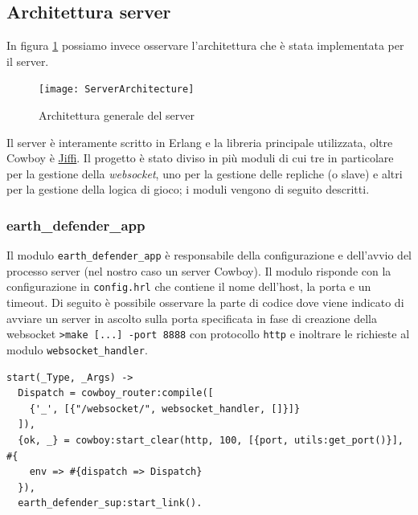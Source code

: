 \documentclass[paper=a4, fontsize=11pt]{scrartcl} %
\numberwithin{equation}{section} %
\numberwithin{figure}{section} %
\numberwithin{table}{section} %
\begin{document}
\subsection{Architettura server}
In figura \ref{ServerArc} possiamo invece osservare l'architettura che è stata implementata per il server.

\begin{figure}
\centering
\texttt{[image: ServerArchitecture]}
\caption{Architettura generale del server}
\label{ServerArc}
\end{figure}

Il server è interamente scritto in Erlang e la libreria principale utilizzata, oltre Cowboy è \href{https://github.com/davisp/jiffy}{Jiffi}. Il progetto è stato diviso in più moduli di cui tre in particolare per la gestione della \textit{websocket}, uno per la gestione delle repliche (o slave) e altri per la gestione della logica di gioco; i moduli vengono di seguito descritti.
\subsubsection{earth\_defender\_app}
Il modulo \texttt{earth\_defender\_app} è responsabile della configurazione e dell'avvio del processo server (nel nostro caso un server Cowboy). Il modulo risponde con la configurazione in \texttt{config.hrl} che contiene il nome dell'host, la porta e un timeout.
Di seguito è possibile osservare la parte di codice dove viene indicato di avviare un server in ascolto sulla porta specificata in fase di creazione della websocket \texttt{>make [...] -port 8888} con protocollo \texttt{http} e inoltrare le richieste al modulo \texttt{websocket\_handler}.
\begin{lstlisting}[basicstyle=\footnotesize]
start(_Type, _Args) ->
  Dispatch = cowboy_router:compile([
    {'_', [{"/websocket/", websocket_handler, []}]}
  ]),
  {ok, _} = cowboy:start_clear(http, 100, [{port, utils:get_port()}], #{
    env => #{dispatch => Dispatch}
  }),
  earth_defender_sup:start_link().
\end{lstlisting}
\end{document}
